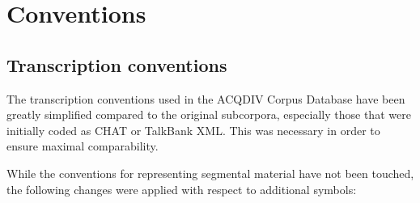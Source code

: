 \documentclass[a4paper, 11pt]{book}
\begin{document}
\section{Conventions}
\label{sec:Conventions and standardization}

\subsection{Transcription conventions}
\label{subsec:Transcription conventions}

The transcription conventions used in the ACQDIV Corpus Database have been greatly simplified compared to the original subcorpora, especially those that were initially coded as CHAT or TalkBank XML. This was necessary in order to ensure maximal comparability. 

While the conventions for representing segmental material have not been touched, the following changes were applied with respect to additional symbols: 
\end{document}

